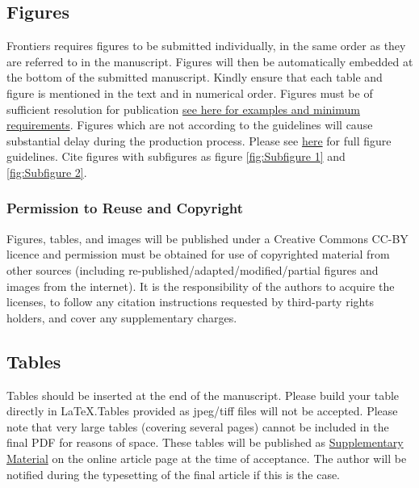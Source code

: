 \documentclass[utf8]{FrontiersinVancouver}
\begin{document}
\subsection{Figures}
Frontiers requires figures to be submitted individually, in the same order as they are referred to in the manuscript. Figures will then be automatically embedded at the bottom of the submitted manuscript. Kindly ensure that each table and figure is mentioned in the text and in numerical order. Figures must be of sufficient resolution for publication \href{https://www.frontiersin.org/about/author-guidelines#ImageSizeRequirements}{see here for examples and minimum requirements}. Figures which are not according to the guidelines will cause substantial delay during the production process. Please see \href{https://www.frontiersin.org/about/author-guidelines#FigureRequirementsStyleGuidelines}{here} for full figure guidelines. Cite figures with subfigures as figure \ref{fig:Subfigure 1} and \ref{fig:Subfigure 2}.


\subsubsection{Permission to Reuse and Copyright}
Figures, tables, and images will be published under a Creative Commons CC-BY licence and permission must be obtained for use of copyrighted material from other sources (including re-published/adapted/modified/partial figures and images from the internet). It is the responsibility of the authors to acquire the licenses, to follow any citation instructions requested by third-party rights holders, and cover any supplementary charges.

\subsection{Tables}
Tables should be inserted at the end of the manuscript. Please build your table directly in LaTeX.Tables provided as jpeg/tiff files will not be accepted. Please note that very large tables (covering several pages) cannot be included in the final PDF for reasons of space. These tables will be published as \href{http://home.frontiersin.org/about/author-guidelines#SupplementaryMaterial}{Supplementary Material} on the online article page at the time of acceptance. The author will be notified during the typesetting of the final article if this is the case. 
\end{document}
